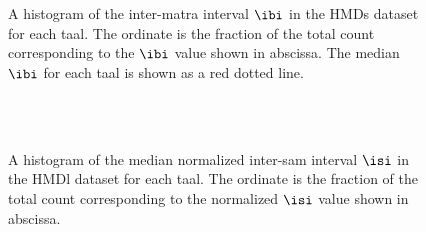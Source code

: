 \begin{figure}[t]
\centering
{} \hspace{0.5cm} 
 \\ 
 \hspace{0.5cm} 
 \\ 
\caption[Histogram of $\protect\ibi$ in the \acrshort{HMDs} dataset]{A histogram of the inter-\gls{matra} interval $\protect\ibi$ in the \acrshort{HMDs} dataset for each \gls{taal}. The ordinate is the fraction of the total count corresponding to the $\ibi$ value shown in abscissa. The median $\ibi$ for each \gls{taal} is shown as a red dotted line.}\label{fig:dstats:HMDs:IAI}
\end{figure}
%
\begin{figure}[t]
\centering
{} \hspace{0.5cm} 
 \\ 
 \hspace{0.5cm} 
 \\ 
\caption[Histogram of median normalized $\protect\isi$ in the \acrshort{HMDl} dataset]{A histogram of the median normalized inter-\gls{sam} interval $\protect\isi$ in the \acrshort{HMDl} dataset for each \gls{taal}. The ordinate is the fraction of the total count corresponding to the normalized $\isi$ value shown in abscissa.}\label{fig:dstats:HMDl:ISInorm}
\end{figure}
%

